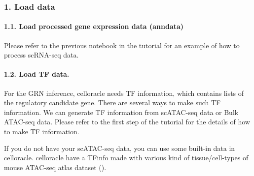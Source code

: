 \documentclass[letterpaper,10pt,english]{sphinxmanual}
\begin{document}
\subsubsection{1. Load data}
\label{\detokenize{notebooks/04_Network_analysis/Network_analysis_with_with_Paul_etal_2015_data:1.-Load-data}}

\paragraph{1.1. Load processed gene expression data (anndata)}
\label{\detokenize{notebooks/04_Network_analysis/Network_analysis_with_with_Paul_etal_2015_data:1.1.-Load-processed-gene-expression-data-(anndata)}}
Please refer to the previous notebook in the tutorial for an example of how to process scRNA-seq data.

{
%
\begin{sphinxVerbatim}[commandchars=\\\{\}]
\llap{\color{nbsphinxin}[7]:\,\hspace{\fboxrule}\hspace{\fboxsep}}
  
\end{sphinxVerbatim}
}


\paragraph{1.2. Load TF data.}
\label{\detokenize{notebooks/04_Network_analysis/Network_analysis_with_with_Paul_etal_2015_data:1.2.-Load-TF-data.}}
For the GRN inference, celloracle needs TF information, which contains lists of the regulatory candidate gene. There are several ways to make such TF information. We can generate TF information from scATAC-seq data or Bulk ATAC-seq data. Please refer to the first step of the tutorial for the details of how to make TF information.

If you do not have your scATAC-seq data, you can use some built-in data in celloracle. celloracle have a TFinfo made with various kind of tissue/cell-types of mouse ATAC-seq atlas dataset ().
\end{document}
